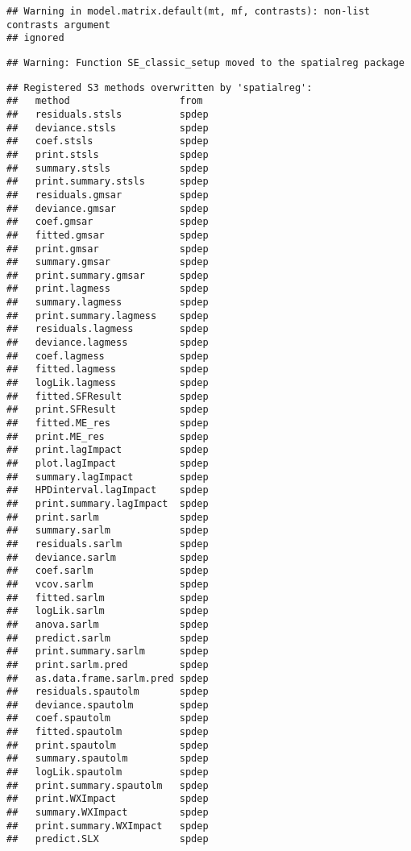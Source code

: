 \documentclass[10pt,letterpaper]{article}
\begin{document}
\begin{verbatim}
## Warning in model.matrix.default(mt, mf, contrasts): non-list contrasts argument
## ignored
\end{verbatim}

\begin{verbatim}
## Warning: Function SE_classic_setup moved to the spatialreg package
\end{verbatim}

\begin{verbatim}
## Registered S3 methods overwritten by 'spatialreg':
##   method                   from 
##   residuals.stsls          spdep
##   deviance.stsls           spdep
##   coef.stsls               spdep
##   print.stsls              spdep
##   summary.stsls            spdep
##   print.summary.stsls      spdep
##   residuals.gmsar          spdep
##   deviance.gmsar           spdep
##   coef.gmsar               spdep
##   fitted.gmsar             spdep
##   print.gmsar              spdep
##   summary.gmsar            spdep
##   print.summary.gmsar      spdep
##   print.lagmess            spdep
##   summary.lagmess          spdep
##   print.summary.lagmess    spdep
##   residuals.lagmess        spdep
##   deviance.lagmess         spdep
##   coef.lagmess             spdep
##   fitted.lagmess           spdep
##   logLik.lagmess           spdep
##   fitted.SFResult          spdep
##   print.SFResult           spdep
##   fitted.ME_res            spdep
##   print.ME_res             spdep
##   print.lagImpact          spdep
##   plot.lagImpact           spdep
##   summary.lagImpact        spdep
##   HPDinterval.lagImpact    spdep
##   print.summary.lagImpact  spdep
##   print.sarlm              spdep
##   summary.sarlm            spdep
##   residuals.sarlm          spdep
##   deviance.sarlm           spdep
##   coef.sarlm               spdep
##   vcov.sarlm               spdep
##   fitted.sarlm             spdep
##   logLik.sarlm             spdep
##   anova.sarlm              spdep
##   predict.sarlm            spdep
##   print.summary.sarlm      spdep
##   print.sarlm.pred         spdep
##   as.data.frame.sarlm.pred spdep
##   residuals.spautolm       spdep
##   deviance.spautolm        spdep
##   coef.spautolm            spdep
##   fitted.spautolm          spdep
##   print.spautolm           spdep
##   summary.spautolm         spdep
##   logLik.spautolm          spdep
##   print.summary.spautolm   spdep
##   print.WXImpact           spdep
##   summary.WXImpact         spdep
##   print.summary.WXImpact   spdep
##   predict.SLX              spdep
\end{verbatim}
\end{document}
